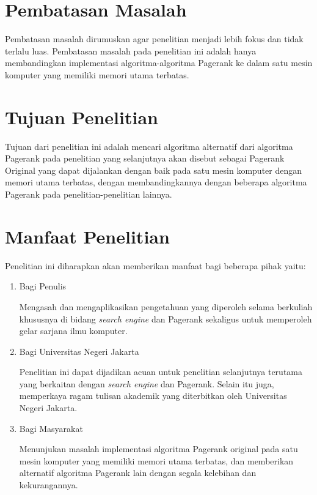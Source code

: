 \section{Pembatasan Masalah}

Pembatasan masalah dirumuskan agar penelitian menjadi lebih fokus dan tidak terlalu luas. Pembatasan masalah pada penelitian ini adalah hanya membandingkan implementasi algoritma-algoritma Pagerank ke dalam satu mesin komputer yang memiliki memori utama terbatas. 

\section{Tujuan Penelitian}

Tujuan dari penelitian ini adalah mencari algoritma alternatif dari algoritma Pagerank pada penelitian \citet{ilprints422} yang selanjutnya akan disebut sebagai Pagerank Original yang dapat dijalankan dengan baik pada satu mesin komputer dengan memori utama terbatas, dengan membandingkannya dengan beberapa algoritma Pagerank pada penelitian-penelitian lainnya.

\section{Manfaat Penelitian}

Penelitian ini diharapkan akan memberikan manfaat bagi beberapa pihak yaitu:

\begin{enumerate}
\item Bagi Penulis

Mengasah dan mengaplikasikan pengetahuan yang diperoleh selama berkuliah khususnya di bidang \textit{search engine} dan Pagerank sekaligus untuk memperoleh gelar sarjana ilmu komputer.

\item Bagi Universitas Negeri Jakarta

Penelitian ini dapat dijadikan acuan untuk penelitian selanjutnya terutama yang berkaitan dengan \textit{search engine} dan Pagerank. Selain itu juga, memperkaya ragam tulisan akademik yang diterbitkan oleh Universitas Negeri Jakarta.

\item Bagi Masyarakat

Menunjukan masalah implementasi algoritma Pagerank original pada satu mesin komputer yang memiliki memori utama terbatas, dan memberikan alternatif algoritma Pagerank lain dengan segala kelebihan dan kekurangannya.
\end{enumerate}